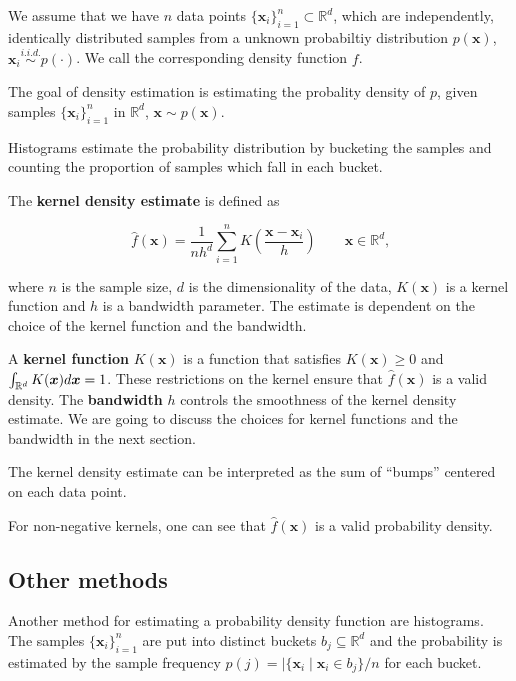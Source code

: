 \documentclass{article}
\begin{document}
We assume that we have $n$ data points $\{\bm{x}_i\}_{i=1}^n \subset \mathbb{R}^d$, which are independently, identically distributed samples from a unknown probabiltiy distribution $p(\bm{x})$, $\bm{x}_i \overset{i.i.d.}{\sim} p(\cdot)$. We call the corresponding density function $f$. 

The goal of density estimation is estimating the probality density of $p$, given samples $\{\bm{x}_i\}_{i=1}^n$ in $\mathbb{R}^d$, $\bm{x} \sim p(\bm{x})$.


Histograms estimate the probability distribution by bucketing the samples and counting the proportion of samples which fall in each bucket.

The \textbf{kernel density estimate} is defined as

\begin{equation}
	\hat{f}(\bm{x}) = \frac{1}{nh^d} \sum_{i=1}^n K\left(\frac{\bm{x} - \bm{x}_i}{h} \right) \qquad \bm{x} \in \mathbb{R}^d\text{,}
	\label{eq:kernel-density-estimate}
\end{equation}

where $n$ is the sample size, $d$ is the dimensionality of the data, $K(\bm{x})$ is a kernel function and $h$ is a bandwidth parameter. The estimate is dependent on the choice of the kernel function and the bandwidth.

A \textbf{kernel function} $K(\bm{x})$ is a function that satisfies $K(\bm{x}) \geq 0$ and $\int_{\mathbb{R}^d} K(\bm{x}) d\bm{x} =\nobreak 1$. These restrictions on the kernel ensure that $\hat{f}(\bm{x})$ is a valid density. The \textbf{bandwidth} $h$ controls the smoothness of the kernel density estimate. We are going to discuss the choices for kernel functions and the bandwidth in the next section.

The kernel density estimate can be interpreted as the sum of ``bumps'' centered on each data point.

For non-negative kernels, one can see that $\hat{f}(\bm{x})$ is a valid probability density.


\subsection{Other methods}

Another method for estimating a probability density function are histograms. The samples $\{ \bm{x}_i \}_{i=1}^n$ are put into distinct buckets $b_j \subseteq \mathbb{R}^d$ and the probability is estimated by the sample frequency $p(j) = \lvert \{\bm{x}_i \mid \bm{x}_i \in b_j\} / n$ for each bucket.
\end{document}
